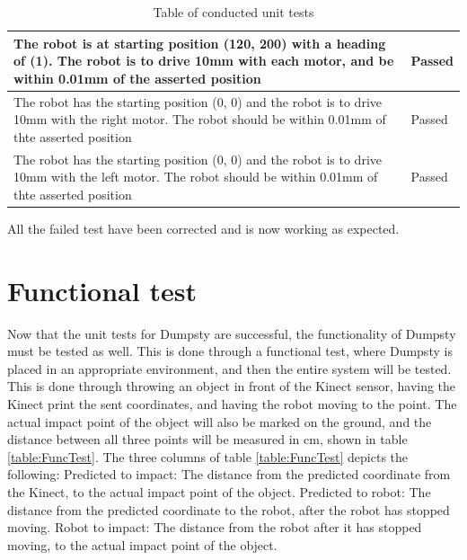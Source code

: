 \begin{table}[H]
\begin{center}
\begin{tabular}{ | p{10cm} | p{5cm} |}
			The robot is at starting position (120, 200) with a heading of (1). The robot is to drive 10mm with each motor, and be within 0.01mm of the asserted position & Passed \\ \hline
			The robot has the starting position (0, 0) and the robot is to drive 10mm with the right motor. The robot should be within 0.01mm of thte asserted position & Passed \\ \hline
			The robot has the starting position (0, 0) and the robot is to drive 10mm with the left motor. The robot should be within 0.01mm of thte asserted position & Passed \\ \hline
		\end{tabular}
		\caption{Table of conducted unit tests}
		\label{table:Unit tests}
	\end{center}
\end{table}


All the failed test have been corrected and is now working as expected. 


\section{Functional test}
\label{sec:LasseSucks}
Now that the unit tests for Dumpsty are successful, the functionality of Dumpsty must be tested as well. This is done through a functional test, where Dumpsty is placed in an appropriate environment, and then the entire system will be tested. This is done through throwing an object in front of the Kinect sensor, having the Kinect print the sent coordinates, and having the robot moving to the point. The actual impact point of the object will also be marked on the ground, and the distance between all three points will be measured in cm, shown in table \ref{table:FuncTest}. \newline
The three columns of table \ref{table:FuncTest} depicts the following:\newline
Predicted to impact: The distance from the predicted coordinate from the Kinect, to the actual impact point of the object.\newline
Predicted to robot: The distance from the predicted coordinate to the robot, after the robot has stopped moving.\newline
Robot to impact: The distance from the robot after it has stopped moving, to the actual impact point of the object.


